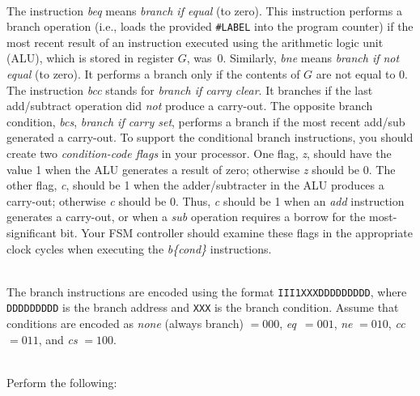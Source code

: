\documentclass[epsfig,10pt,fullpage]{article}
\begin{document}
~\\
\noindent
The instruction {\it beq} means {\it branch if equal} (to zero). This instruction performs
a branch operation (i.e., loads the provided \texttt{\#LABEL} into the program counter) if the 
most recent result of an instruction executed using the
arithmetic logic unit (ALU), which is stored in register $G$, was~0. 
Similarly, {\it bne} means {\it branch if not
equal} (to zero).  It performs a branch only if the contents of $G$ are not equal to 0.
The instruction {\it bcc} stands for {\it branch if carry clear}. It branches if the last
add/subtract operation did {\it not} produce a carry-out. The opposite branch condition, 
{\it bcs}, {\it branch if carry set}, performs a branch if the most recent add/sub
generated a carry-out. To support the conditional branch instructions, you should 
create two {\it condition-code flags} in your processor. One flag, {\it z}, should have
the value 1 when the ALU generates a result of zero; otherwise {\it z} should be 0. The other 
flag, {\it c}, should be 1 when the adder/subtracter in the ALU produces a carry-out;
otherwise {\it c} should be 0. Thus, {\it c} should be 1 when an {\it add} 
instruction generates a carry-out,
or when a {\it sub} operation requires a borrow for the most-significant bit. Your FSM
controller should examine these flags in the appropriate clock cycles when executing the 
{\it b\{cond\}} instructions.

~\\
\noindent
The branch instructions are encoded using the format \texttt{III1XXXDDDDDDDDD}, where
\texttt{DDDDDDDDD} is the branch address and \texttt{XXX} is the branch condition. Assume
that conditions are encoded as {\it none} (always branch) $= 000$, {\it eq}~$= 001$,
{\it ne} $= 010$, {\it cc} $= 011$, and {\it cs} $= 100$.

~\\
\noindent
Perform the following:
\end{document}
